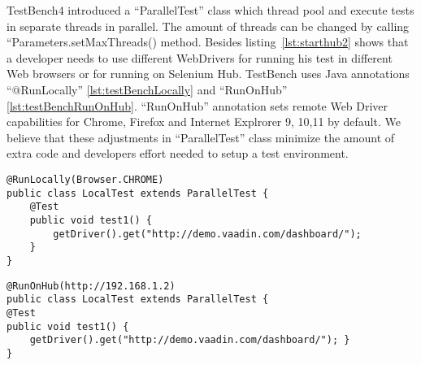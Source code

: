 TestBench4 introduced a ``ParallelTest'' class which thread pool and execute tests
in separate threads in parallel. The amount of threads can be changed by
calling ``Parameters.setMaxThreads() method. Besides listing~\ref{lst:starthub2}
shows that a developer needs to use different WebDrivers for running his test in
different Web browsers or for running on Selenium Hub. TestBench uses Java
annotations ``@RunLocally'' \ref{lst:testBenchLocally} and ``RunOnHub''
\ref{lst:testBenchRunOnHub}.
``RunOnHub'' annotation sets remote Web Driver capabilities for Chrome, Firefox and Internet Explrorer 9,
10,11 by default. We believe that these adjustments in ``ParallelTest'' class
minimize the amount of extra code and developers effort needed to setup a test
environment.
\lstset{style=a1listing}
\begin{lstlisting}[caption=Run test in local Chrome browser locally,label={lst:testBenchLocally}] 
@RunLocally(Browser.CHROME)
public class LocalTest extends ParallelTest { 
	@Test
	public void test1() {
		getDriver().get("http://demo.vaadin.com/dashboard/");
	}
}
\end{lstlisting}

\lstset{style=a1listing}
\begin{lstlisting}[caption=Run tests on Selenium hub on http://192.168.1.2, label={lst:testBenchRunOnHub}]
@RunOnHub(http://192.168.1.2)
public class LocalTest extends ParallelTest {
@Test
public void test1() {
	getDriver().get("http://demo.vaadin.com/dashboard/"); }
}
\end{lstlisting}

